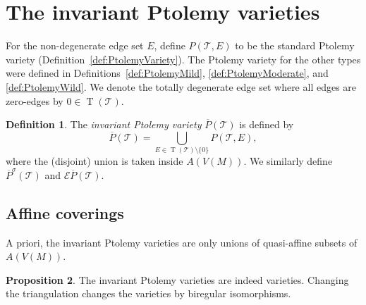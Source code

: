 \documentclass[11pt]{amsart}
\theoremstyle{plain}
\newtheorem{theorem}{Theorem}[section]
\theoremstyle{definition}
\newtheorem{proposition}[theorem]{Proposition}
\newtheorem{definition}[theorem]{Definition}
\numberwithin{equation}{section}
\newcommand{\T}{\mathcal T}
\newcommand{\E}{\mathcal E}
\DeclareMathOperator{\TE}{T}
\begin{document}
\section{The invariant Ptolemy varieties}\label{sec:Invariant}
For the non-degenerate edge set $E$, define $P(\T,E)$ to be the standard Ptolemy variety (Definition~\ref{def:PtolemyVariety}). The Ptolemy variety for the other types were defined in Definitions~\ref{def:PtolemyMild}, \ref{def:PtolemyModerate}, and \ref{def:PtolemyWild}. We denote the totally degenerate edge set where all edges are zero-edges by $0\in\TE(\T)$. 
\begin{definition}\label{def:InvariantPtolemy} The \emph{invariant Ptolemy variety} $\overline P(\T)$ is defined by
\begin{equation}
\overline P(\T)=\bigcup_{E\in\TE(\T)\setminus\{0\}} P(\T,E),
\end{equation}
where the (disjoint) union is taken inside $A(V(M))$. We similarly define $\overline P^\sigma(\T)$ and $\E\overline P(\T)$.
\end{definition}

\subsection{Affine coverings}
A priori, the invariant Ptolemy varieties are only unions of quasi-affine subsets of $A(V(M))$.
\begin{proposition}\label{prop:ProofAffine}
The invariant Ptolemy varieties are indeed varieties. Changing the triangulation changes the varieties by biregular isomorphisms.
\end{proposition}

\end{document}
